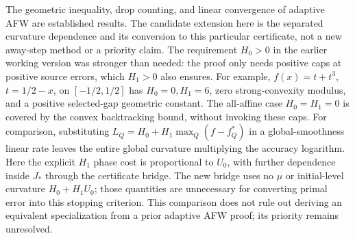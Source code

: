 The geometric inequality, drop counting, and linear convergence of
adaptive AFW are established results. The candidate extension here is
the separated curvature dependence and its conversion to this particular
certificate, not a new away-step method or a priority claim.
The requirement $H_0>0$ in the earlier working version was stronger
than needed: the proof only needs positive caps at positive source
errors, which $H_1>0$ also ensures. For example,
$f(x)=t+t^3$, $t=1/2-x$, on $[-1/2,1/2]$ has $H_0=0,H_1=6$,
zero strong-convexity modulus, and a positive selected-gap geometric
constant. The all-affine case $H_0=H_1=0$ is covered by the convex
backtracking bound, without invoking these caps.
For comparison, substituting
$L_Q=H_0+H_1\max_Q(f-f_Q^*)$ in a global-smoothness linear rate leaves
the entire global curvature multiplying the accuracy logarithm.
Here the explicit $H_1$ phase cost is proportional to $U_0$, with further
dependence inside $J_*$ through the certificate bridge. The new bridge
uses no $\mu$ or initial-level curvature $H_0+H_1U_0$; those quantities
are unnecessary for converting primal error into this stopping criterion.
This comparison
does not rule out deriving an equivalent specialization from a prior
adaptive AFW proof; its priority remains unresolved.
